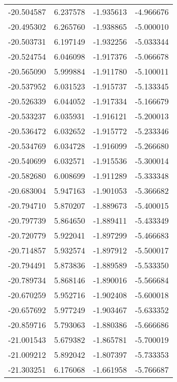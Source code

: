 \begin{tabular}{rrrr}
      -20.504587 &         6.237578 &   -1.935613 &  -4.966676 \\
      -20.495302 &         6.265760 &   -1.938865 &  -5.000010 \\
      -20.503731 &         6.197149 &   -1.932256 &  -5.033344 \\
      -20.524754 &         6.046098 &   -1.917376 &  -5.066678 \\
      -20.565090 &         5.999884 &   -1.911780 &  -5.100011 \\
      -20.537952 &         6.031523 &   -1.915737 &  -5.133345 \\
      -20.526339 &         6.044052 &   -1.917334 &  -5.166679 \\
      -20.533237 &         6.035931 &   -1.916121 &  -5.200013 \\
      -20.536472 &         6.032652 &   -1.915772 &  -5.233346 \\
      -20.534769 &         6.034728 &   -1.916099 &  -5.266680 \\
      -20.540699 &         6.032571 &   -1.915536 &  -5.300014 \\
      -20.582680 &         6.008699 &   -1.911289 &  -5.333348 \\
      -20.683004 &         5.947163 &   -1.901053 &  -5.366682 \\
      -20.794710 &         5.870207 &   -1.889673 &  -5.400015 \\
      -20.797739 &         5.864650 &   -1.889411 &  -5.433349 \\
      -20.720779 &         5.922041 &   -1.897299 &  -5.466683 \\
      -20.714857 &         5.932574 &   -1.897912 &  -5.500017 \\
      -20.794491 &         5.873836 &   -1.889589 &  -5.533350 \\
      -20.789734 &         5.868146 &   -1.890016 &  -5.566684 \\
      -20.670259 &         5.952716 &   -1.902408 &  -5.600018 \\
      -20.657692 &         5.977249 &   -1.903467 &  -5.633352 \\
      -20.859716 &         5.793063 &   -1.880386 &  -5.666686 \\
      -21.001543 &         5.679382 &   -1.865781 &  -5.700019 \\
      -21.009212 &         5.892042 &   -1.807397 &  -5.733353 \\
      -21.303251 &         6.176068 &   -1.661958 &  -5.766687 \\

\end{tabular}
